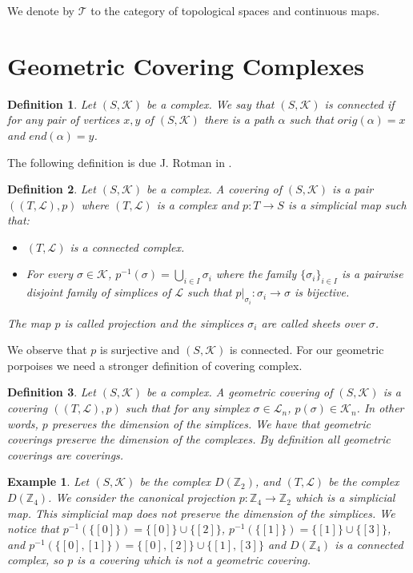 \documentclass{amsart}
\newtheorem{definition}{Definition}[section]
\newtheorem{example}{Example}[section]
\begin{document}
We  denote by $\mathcal{T}$ to the category of topological spaces and continuous maps.


\section{Geometric Covering Complexes}


\begin{definition}
Let $(S,\mathcal{K})$ be a complex. We say that $(S,\mathcal{K})$ is connected if for any pair of vertices $x,y$ of $(S,\mathcal{K})$ there is a path $\alpha$ such that $orig(\alpha)=x$ and $end(\alpha)=y$.
\end{definition}

The following definition is due J. Rotman in \cite{rotman1973covering}.

\begin{definition}
Let $(S,\mathcal{K})$ be a complex. A covering of $(S,\mathcal{K})$ is a pair $((T,\mathcal{L}),p)$ where $(T,\mathcal{L})$ is a complex and $p\colon T\longrightarrow S$ is a simplicial map such that:
\begin{itemize}
\item $(T,\mathcal{L})$ is a connected complex.
\item For every $\sigma\in\mathcal{K}$, $p^{-1}(\sigma)=\bigcup_{i\in I}\sigma_i$ where the family $\{\sigma_i\}_{i\in I}$ is a pairwise disjoint family of simplices of $\mathcal{L}$ such that $p|_{\sigma_i}\colon \sigma_i\longrightarrow \sigma$ is bijective.
\end{itemize}
The map $p$ is called projection and the simplices $\sigma_i$ are called sheets over $\sigma$.
\end{definition}

We observe that $p$ is surjective and $(S,\mathcal{K})$ is connected. For our geometric porpoises we need a stronger definition of covering complex.

\begin{definition}
Let $(S,\mathcal{K})$ be a complex. A geometric covering of $(S,\mathcal{K})$ is a covering $((T,\mathcal{L}),p)$ such that for any simplex $\sigma\in\mathcal{L}_n$, $p(\sigma)\in\mathcal{K}_n$. In other words, $p$ preserves the dimension of the simplices. We have that geometric coverings preserve the dimension of the complexes. By definition all geometric coverings are coverings.
\end{definition}

\begin{example}
Let $(S,\mathcal{K})$ be the complex $D(\mathbb{Z}_2)$, and $(T,\mathcal{L})$ be the complex  $D(\mathbb{Z}_4)$. We consider the canonical projection $p\colon \mathbb{Z}_4\longrightarrow \mathbb{Z}_2$ which is a simplicial map. This simplicial map does not preserve the dimension of the simplices.  We notice that $p^{-1}(\{[0]\})=\{[0]\}\cup\{[2]\}$, $p^{-1}(\{[1]\})=\{[1]\}\cup\{[3]\}$, and $p^{-1}(\{[0],[1]\})=\{[0],[2]\}\cup\{[1],[3]\}$ and $D(\mathbb{Z}_4)$ is a connected complex, so $p$ is a covering which is not a geometric covering.
\end{example}
\end{document}
